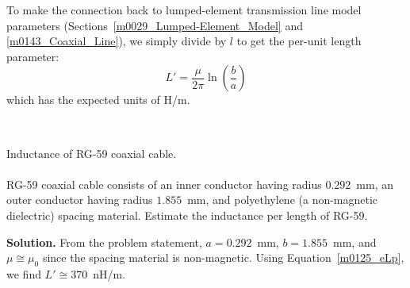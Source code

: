 To make the connection back to lumped-element transmission line model parameters (Sections~\ref{m0029_Lumped-Element_Model} and \ref{m0143_Coaxial_Line}), we simply divide by $l$ to get the per-unit length parameter:
%
\begin{equation}
\boxed{
L' = \frac{\mu}{2\pi} \ln\left(\frac{b}{a}\right)   
}
\label{m0125_eLp}
\end{equation}
%
which has the expected units of H/m.


~\\ \begin{example} 
\begin{mdframed}[backgroundcolor=brown!20,linecolor=brown!20]\raggedright
Inductance of RG-59 coaxial cable.
\\~\\
RG-59 coaxial cable consists of an inner conductor having radius $0.292$~mm, an outer conductor having radius $1.855$~mm, and polyethylene (a non-magnetic dielectric) spacing material.
Estimate the inductance per length of RG-59.

{\bf Solution.}  From the problem statement, 
$a=0.292$~mm, 
$b=1.855$~mm, 
and $\mu \cong \mu_0$ since the spacing material is non-magnetic.
Using Equation~\ref{m0125_eLp}, we find $L'\cong 370$~nH/m.
\end{mdframed}\end{example}

